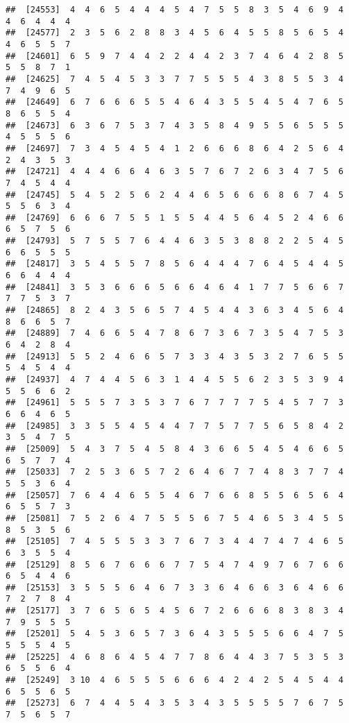 \documentclass[
]{book}
\begin{document}
\begin{verbatim}
##  [24553]  4  4  6  5  4  4  4  5  4  7  5  5  8  3  5  4  6  9  4  4  6  4  4  4
##  [24577]  2  3  5  6  2  8  8  3  4  5  6  4  5  5  8  5  6  5  4  4  6  5  5  7
##  [24601]  6  5  9  7  4  4  2  2  4  4  2  3  7  4  6  4  2  8  5  5  5  8  7  1
##  [24625]  7  4  5  4  5  3  3  7  7  5  5  5  4  3  8  5  5  3  4  7  4  9  6  5
##  [24649]  6  7  6  6  6  5  5  4  6  4  3  5  5  4  5  4  7  6  5  8  6  5  5  4
##  [24673]  6  3  6  7  5  3  7  4  3  5  8  4  9  5  5  6  5  5  5  4  5  5  5  6
##  [24697]  7  3  4  5  4  5  4  1  2  6  6  6  8  6  4  2  5  6  4  2  4  3  5  3
##  [24721]  4  4  4  6  6  4  6  3  5  7  6  7  2  6  3  4  7  5  6  7  4  5  4  4
##  [24745]  5  4  5  2  5  6  2  4  4  6  5  6  6  6  8  6  7  4  5  5  5  6  3  4
##  [24769]  6  6  6  7  5  5  1  5  5  4  4  5  6  4  5  2  4  6  6  6  5  7  5  6
##  [24793]  5  7  5  5  7  6  4  4  6  3  5  3  8  8  2  2  5  4  5  6  6  5  5  5
##  [24817]  3  5  4  5  5  7  8  5  6  4  4  4  7  6  4  5  4  4  5  6  6  4  4  4
##  [24841]  3  5  3  6  6  6  5  6  6  4  6  4  1  7  7  5  6  6  7  7  7  5  3  7
##  [24865]  8  2  4  3  5  6  5  7  4  5  4  4  3  6  3  4  5  6  4  8  6  6  5  7
##  [24889]  7  4  6  6  5  4  7  8  6  7  3  6  7  3  5  4  7  5  3  6  4  2  8  4
##  [24913]  5  5  2  4  6  6  5  7  3  3  4  3  5  3  2  7  6  5  5  5  4  5  4  4
##  [24937]  4  7  4  4  5  6  3  1  4  4  5  5  6  2  3  5  3  9  4  5  5  6  6  2
##  [24961]  5  5  5  7  3  5  3  7  6  7  7  7  7  5  4  5  7  7  3  6  6  4  6  5
##  [24985]  3  3  5  5  4  5  4  4  7  7  5  7  7  5  6  5  8  4  2  3  5  4  7  5
##  [25009]  5  4  3  7  5  4  5  8  4  3  6  6  5  4  5  4  6  6  5  6  5  7  7  4
##  [25033]  7  2  5  3  6  5  7  2  6  4  6  7  7  4  8  3  7  7  4  5  5  3  6  4
##  [25057]  7  6  4  4  6  5  5  4  6  7  6  6  8  5  5  6  5  6  4  6  5  5  7  3
##  [25081]  7  5  2  6  4  7  5  5  5  6  7  5  4  6  5  3  4  5  5  8  5  3  5  6
##  [25105]  7  4  5  5  5  3  3  7  6  7  3  4  4  7  4  7  4  6  5  6  3  5  5  4
##  [25129]  8  5  6  7  6  6  6  7  7  5  4  7  4  9  7  6  7  6  6  6  5  4  4  6
##  [25153]  3  5  5  5  6  4  6  7  3  3  6  4  6  6  3  6  4  6  6  7  2  7  8  4
##  [25177]  3  7  6  5  6  5  4  5  6  7  2  6  6  6  8  3  8  3  4  7  9  5  5  5
##  [25201]  5  4  5  3  6  5  7  3  6  4  3  5  5  5  6  6  4  7  5  5  5  5  4  5
##  [25225]  4  6  8  6  4  5  4  7  7  8  6  4  4  3  7  5  3  5  3  6  5  5  6  4
##  [25249]  3 10  4  6  5  5  5  6  6  6  4  2  4  2  5  4  5  4  4  6  5  5  6  5
##  [25273]  6  7  4  4  5  4  3  5  3  4  3  5  5  5  5  7  6  7  5  7  5  6  5  7

\end{verbatim}
\end{document}
